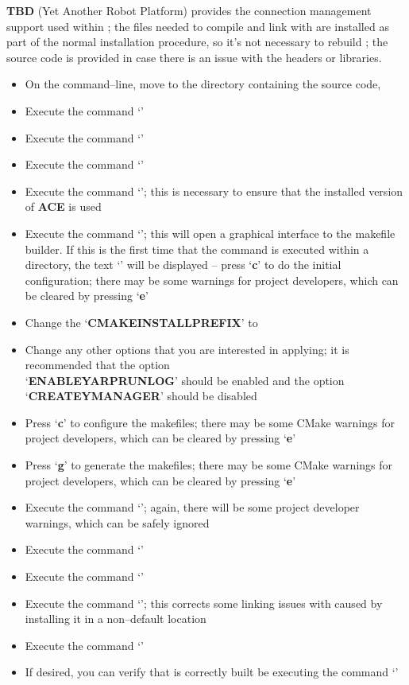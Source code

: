 \tertiaryEnd{}
\textbf{TBD}
\tertiaryEnd{}
\secondaryEnd{}
\textbf{\yarp} (Yet Another Robot Platform) provides the connection management support
used within \mplusm{}; the files needed to compile and link with \yarp{} are installed as
part of the normal \mplusm{} installation procedure, so it's not necessary to rebuild
\yarp{}; the source code is provided in case there is an issue with the headers or
libraries.
\begin{itemize}
\item On the command--line, move to the directory containing the \mplusm{} source code,
\item Execute the command `'
\item Execute the command `'
\item Execute the command `'
\item Execute the command `'; this is necessary to
ensure that the installed version of \textbf{ACE} is used
\item Execute the command `'; this will open a graphical interface to the
makefile builder. If this is the first time that the command is executed within a
directory, the text `' will be displayed -- press `\textbf{c}' to do
the initial configuration; there may be some warnings for project developers, which can be
cleared by pressing `\textbf{e}'
\item Change the `\textbf{CMAKE\fatUnderscore{}INSTALL\fatUnderscore{}PREFIX}' to
\item Change any other options that you are interested in applying; it is recommended that
the option\\
`\textbf{ENABLE\fatUnderscore{}YARPRUN\fatUnderscore{}LOG}' should be enabled and the
option `\textbf{CREATE\fatUnderscore{}YMANAGER}' should be disabled
\item Press `\textbf{c}' to configure the makefiles; there may be some CMake warnings for
project developers, which can be cleared by pressing `\textbf{e}'
\item Press `\textbf{g}' to generate the makefiles; there may be some CMake warnings for
project developers, which can be cleared by pressing `\textbf{e}'
\item Execute the command `'; again, there will be some project developer
warnings, which can be safely ignored
\item Execute the command `'
\item Execute the command `'
\item Execute the command `'; this corrects some linking
issues with \yarp{} caused by installing it in a non--default location
\item Execute the command `'
\item If desired, you can verify that \yarp{} is correctly built be executing the command
`'
\end{itemize}
